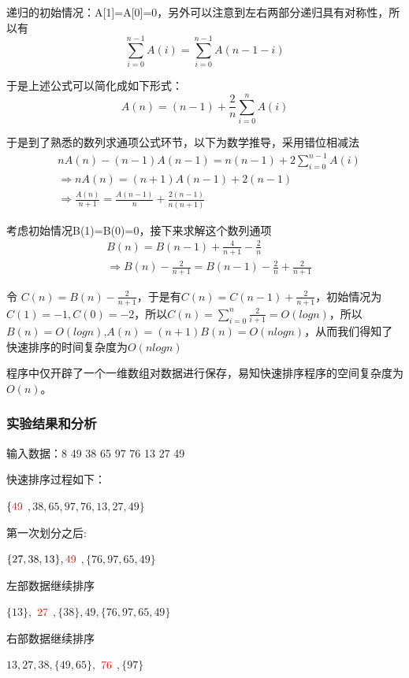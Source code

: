 \documentclass[supercite]{Experimental_Report}
\theoremstyle{definition}
\begin{document}
递归的初始情况：A[1]=A[0]=0，另外可以注意到左右两部分递归具有对称性，所以有
$$ \sum_{i=0}^{n-1}A(i)=\sum_{i=0}^{n-1}A(n-1-i)$$

于是上述公式可以简化成如下形式：
$$ A(n)=(n-1)+\frac{2}{n}\sum_{i=0}^{n}A(i) $$

于是到了熟悉的数列求通项公式环节，以下为数学推导，采用错位相减法
\begin{equation*}
    \begin{split}
    & nA(n)-(n-1)A(n-1)=n(n-1)+2\sum_{i=0}^{n-1}A(i)\\
    &\Longrightarrow nA(n)=(n+1)A(n-1)+2(n-1)\\
    &\Longrightarrow \frac{A(n)}{n+1}=\frac{A(n-1)}{n} + \frac{2(n-1)}{n(n+1)} 
    \end{split}
\end{equation*}

考虑初始情况B(1)=B(0)=0，接下来求解这个数列通项
\begin{equation*}
    \begin{split}
        & B(n)=B(n-1)+\frac{4}{n+1}-\frac{2}{n}\\
        & \Longrightarrow B(n)-\frac{2}{n+1}=B(n-1)-\frac{2}{n}+\frac{2}{n+1}
    \end{split}
\end{equation*}

令 $C(n) = B(n) - \frac{2}{n+1}$，于是有$C(n) = C(n-1)+\frac{2}{n+1}$，初始情况为$C(1)=-1,C(0)=-2$，所以$C(n) = \sum_{i=0}^{n}\frac{2}{i+1}=O(logn)$，所以$B(n)=O(logn)$,$A(n) = (n+1)B(n) = O(nlogn)$，从而我们得知了快速排序的时间复杂度为$O(nlogn)$

程序中仅开辟了一个一维数组对数据进行保存，易知快速排序程序的空间复杂度为$O(n)$。

\subsubsection{实验结果和分析}
输入数据：8 49 38 65 97 76 13 27 49

快速排序过程如下：

$\{\color[rgb]{1,0,0}{49}$
$,38,65,97,76,13,27,49\}$

第一次划分之后:

$\{27,38,13\},\color[rgb]{1,0,0}{49}$
$,\{76,97,65,49\}$

左部数据继续排序

$\{13\},$
$\color[rgb]{1,0,0}{27}$
$,\{38\},49,\{76, 97, 65, 49\}$

右部数据继续排序

$13, 27,38,\{49, 65\},$
$\color[rgb]{1,0,0}{76}$
$,\{97\}$
\end{document}
